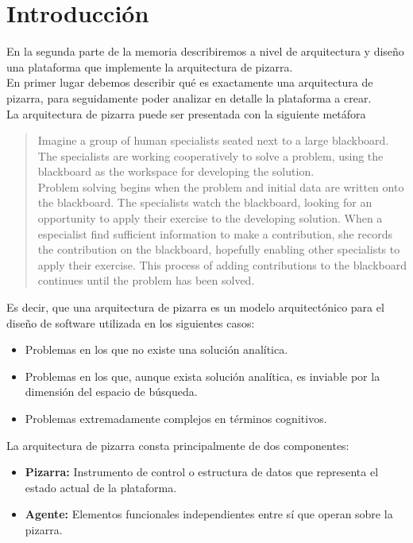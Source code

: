 \chapter{Introducción}
\lettrine[lines=1,slope=4pt,findent=0pt]{E}{}n la segunda parte de la memoria describiremos a nivel de arquitectura y diseño una plataforma que implemente la arquitectura de pizarra. \\

En primer lugar debemos describir qué es exactamente una arquitectura de pizarra, para seguidamente poder analizar en detalle la plataforma a crear.\\

La arquitectura de pizarra puede ser presentada con la siguiente metáfora~\cite{blackboardsystem}

\begin{quote}
Imagine a group of human specialists seated next to a large blackboard. The specialists are working cooperatively to solve a problem, using the blackboard as the workspace for developing the solution.\\
Problem solving begins when the problem and initial data are written onto the blackboard. The specialists watch the blackboard, looking for an opportunity to apply their exercise to the developing solution. When a especialist find sufficient information to make a contribution, she records the contribution on the blackboard, hopefully enabling other specialists to apply their exercise. This process of adding contributions to the blackboard continues until the problem has been solved.
\end{quote}

Es decir, que una arquitectura de pizarra es un modelo arquitectónico para el diseño de software utilizada en los siguientes casos:

\begin{itemize}
	\item Problemas en los que no existe una solución analítica.
	\item Problemas en los que, aunque exista solución analítica, es inviable por la dimensión del espacio de búsqueda.
	\item Problemas extremadamente complejos en términos cognitivos.
\end{itemize}

La arquitectura de pizarra consta principalmente de dos componentes:

\begin{itemize}
	\item \textbf{Pizarra: }Instrumento de control o estructura de datos que representa el estado actual de la plataforma.
	\item \textbf{Agente: }Elementos funcionales independientes entre sí que operan sobre la pizarra.
\end{itemize}

